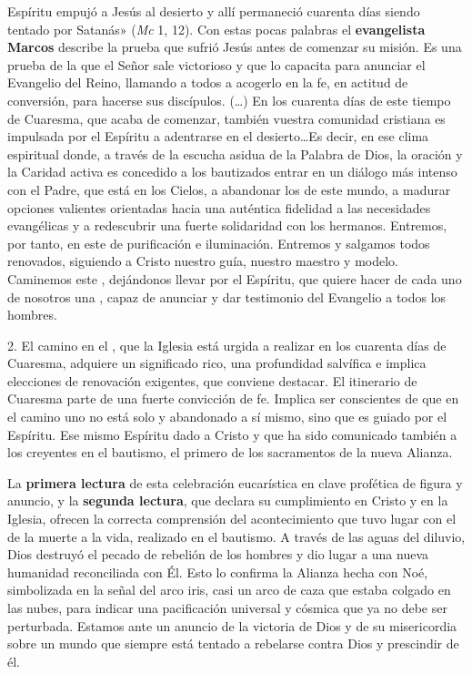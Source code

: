 \begin{body}
 Espíritu empujó a Jesús al desierto y allí permaneció cuarenta días siendo tentado por Satanás» (\textit{Mc} 1, 12). Con estas pocas palabras el \textbf{evangelista Marcos} describe la prueba que sufrió Jesús antes de comenzar su misión. Es una prueba de la que el Señor sale victorioso y que lo capacita para anunciar el Evangelio del Reino, llamando a todos a acogerlo en la fe, en actitud de conversión, para hacerse sus discípulos. (\ldots) En los cuarenta días de este tiempo de Cuaresma, que acaba de comenzar, también vuestra comunidad cristiana es impulsada por el Espíritu a adentrarse en el desierto\ldots Es decir, en ese clima espiritual donde, a través de la escucha asidua de la Palabra de Dios, la oración y la Caridad activa es concedido a los bautizados entrar en un diálogo más intenso con el Padre, que está en los Cielos, a abandonar los  de este mundo, a madurar opciones valientes orientadas hacia una auténtica fidelidad a las necesidades evangélicas y a redescubrir una fuerte solidaridad con los hermanos. Entremos, por tanto, en este  de purificación e iluminación. Entremos y salgamos todos renovados, siguiendo a Cristo nuestro guía, nuestro maestro y modelo. Caminemos este , dejándonos llevar por el Espíritu, que quiere hacer de cada uno de nosotros una , capaz de anunciar y dar testimonio del Evangelio a todos los hombres.

2. El camino en el , que la Iglesia está urgida a realizar en los cuarenta días de Cuaresma, adquiere un significado rico, una profundidad salvífica e implica elecciones de renovación exigentes, que conviene destacar. El itinerario de Cuaresma parte de una fuerte convicción de fe. Implica ser conscientes de que en el camino uno no está solo y abandonado a sí mismo, sino que es guiado por el Espíritu. Ese mismo Espíritu dado a Cristo y que ha sido comunicado también a los creyentes en el bautismo, el primero de los sacramentos de la nueva Alianza.

La \textbf{primera lectura} de esta celebración eucarística en clave profética de figura y anuncio, y la \textbf{segunda lectura}, que declara su cumplimiento en Cristo y en la Iglesia, ofrecen la correcta comprensión del acontecimiento que tuvo lugar con el  de la muerte a la vida, realizado en el bautismo. A través de las aguas del diluvio, Dios destruyó el pecado de rebelión de los hombres y dio lugar a una nueva humanidad reconciliada con Él. Esto lo confirma la Alianza hecha con Noé, simbolizada en la señal del arco iris, casi un arco de caza que estaba colgado en las nubes, para indicar una pacificación universal y cósmica que ya no debe ser perturbada. Estamos ante un anuncio de la victoria de Dios y de su misericordia sobre un mundo que siempre está tentado a rebelarse contra Dios y prescindir de él.


\end{body}
